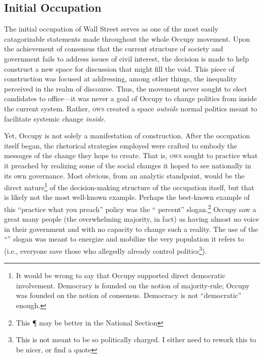 \documentclass{article}
\begin{document}
\subsection{Initial Occupation}
The initial occupation of Wall Street serves as one of the most easily catagorizable statements made throughout the whole Occupy movement.
Upon the achievement of consensus that the current structure of society and government fails to address issues of civil interest, the decision is made to help construct a new space for discussion that might fill the void.
This piece of construction was focused at addressing, among other things, the inequality perceived in the realm of discourse.
Thus, the movement never sought to elect candidates to office---it was never a goal of Occupy to change politics from inside the current system.
Rather, \textsc{ows} created a space \emph{outside} normal politics meant to facilitate systemic change \emph{inside}.

Yet, Occupy is not solely a manifestation of construction.
After the occupation itself began, the rhetorical strategies employed were crafted to embody the messages of the change they hope to create.
That is, \textsc{ows} sought to practice what it preached by realizing some of the social changes it hoped to see nationally in its own governance.
Most obvious, from an analytic standpoint, would be the direct nature\footnote{It would be wrong to say that Occupy supported direct democratic involvement. Democracy is founded on the notion of majority-rule; Occupy was founded on the notion of consensus. Democracy is not ``democratic'' enough.} of the decision-making structure of the occupation itself, but that is likely not the most well-known example.
Perhaps the best-known example of this ``practice what you preach'' policy was the `` percent'' slogan.\footnote{This ¶ may be better in the National Section}
Occupy saw a great many people (the overwhelming majority, in fact) as having almost no voice in their government and with no capacity to change such a reality.
The use of the ``'' slogan was meant to energize and mobilize the very population it refers to (i.e., everyone save those who allegedly already control politics\footnote{This is not meant to be so politically charged. I either need to rework this to be nicer, or find a quote}).
\end{document}
